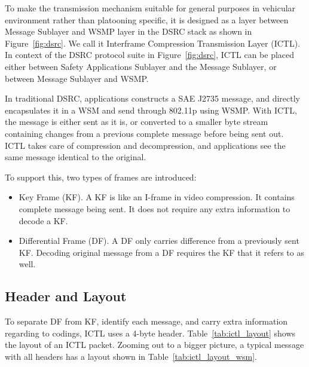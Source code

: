 \documentclass[12pt]{report}
\begin{document}
To make the transmission mechanism suitable for general purposes in vehicular environment rather than platooning specific, it is designed as a layer between Message Sublayer and WSMP layer in the DSRC stack as shown in Figure~\ref{fig:dsrc}. We call it Interframe Compression Transmission Layer (ICTL). In context of the DSRC protocol suite in Figure~\ref{fig:dsrc}, ICTL can be placed either between Safety Applications Sublayer and the Message Sublayer, or between Message Sublayer and WSMP.

In traditional DSRC, applications constructs a SAE J2735 message, and directly encapsulates it in a WSM and send through 802.11p using WSMP. With ICTL, the message is either sent as it is, or converted to a smaller byte stream containing changes from a previous complete message before being sent out. ICTL takes care of compression and decompression, and applications see the same message identical to the original.

To support this, two types of frames are introduced:

\begin{itemize}
  \item Key Frame (KF). A KF is like an I-frame in video compression. It contains complete message being sent. It does not require any extra information to decode a KF.
  \item Differential Frame (DF). A DF only carries difference from a previously sent KF. Decoding original message from a DF requires the KF that it refers to as well.
\end{itemize}

\subsection{Header and Layout}

To separate DF from KF, identify each message, and carry extra information regarding to codings, ICTL uses a 4-byte header. Table~\ref{tab:ictl_layout} shows the layout of an ICTL packet. Zooming out to a bigger picture, a typical message with all headers has a layout shown in Table~\ref{tab:ictl_layout_wsm}.
\end{document}
